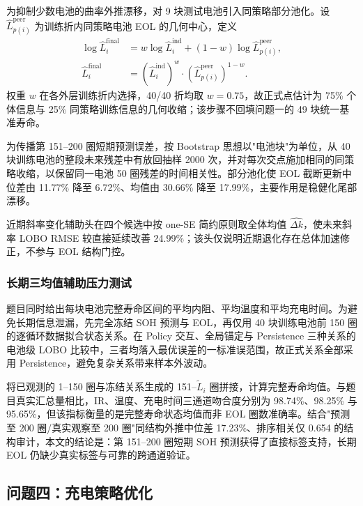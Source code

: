 \documentclass[withoutpreface]{cumcmthesis}
\begin{document}
为抑制少数电池的曲率外推漂移，对 9 块测试电池引入同策略部分池化。设 $\widehat L_{p(i)}^{\mathrm{peer}}$ 为训练折内同策略电池 EOL 的几何中心，定义
\begin{align}
\log \widehat L_i^{\mathrm{final}}
&=w\log \widehat L_i^{\mathrm{ind}}
+(1-w)\log \widehat L_{p(i)}^{\mathrm{peer}},\\
\widehat L_i^{\mathrm{final}}
&=(\widehat L_i^{\mathrm{ind}})^w
\cdot(\widehat L_{p(i)}^{\mathrm{peer}})^{1-w}.
\end{align}
权重 $w$ 在各外层训练折内选择，40/40 折均取 $w=0.75$，故正式点估计为 75\% 个体信息与 25\% 同策略训练信息的几何收缩；该步骤不回填问题一的 49 块统一基准寿命。

为传播第 151--200 圈短期预测误差，按 Bootstrap 思想\cite{efron1979}以"电池块"为单位，从 40 块训练电池的整段未来残差中有放回抽样 2000 次，并对每次交点施加相同的同策略收缩，以保留同一电池 50 圈残差的时间相关性。部分池化使 EOL 截断更新中位差由 11.77\% 降至 6.72\%、均值由 30.66\% 降至 17.99\%，主要作用是稳健化尾部漂移。

近期斜率变化辅助头在四个候选中按 one-SE 简约原则取全体均值 $\widehat{\Delta k}$，使未来斜率 LOBO RMSE 较直接延续改善 24.99\%；该头仅说明近期退化存在总体加速修正，不参与 EOL 结构门控。

\subsubsection{长期三均值辅助压力测试}

题目同时给出每块电池完整寿命区间的平均内阻、平均温度和平均充电时间。为避免长期信息泄漏，先完全冻结 SOH 预测与 EOL，再仅用 40 块训练电池前 150 圈的逐循环数据拟合状态关系。在 Policy 交互、全局锚定与 Persistence 三种关系的电池级 LOBO 比较中，三者均落入最优误差的一标准误范围，故正式关系全部采用 Persistence，避免复杂关系带来样本外波动。

将已观测的 1--150 圈与冻结关系生成的 151--$\widetilde L_i$ 圈拼接，计算完整寿命均值。与题目真实汇总量相比，IR、温度、充电时间三通道吻合度分别为 98.74\%、98.25\% 与 95.65\%，但该指标衡量的是完整寿命状态均值而非 EOL 圈数准确率。结合"预测至 200 圈/真实观察至 200 圈"同结构外推中位差 17.23\%、排序相关仅 0.654 的结构审计，本文的结论是：第 151--200 圈短期 SOH 预测获得了直接标签支持，长期 EOL 仍缺少真实标签与可靠的跨通道验证。

\subsection{问题四：充电策略优化}
\end{document}
